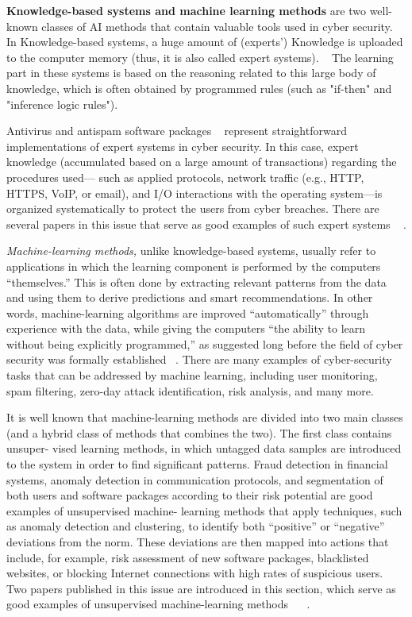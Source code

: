 \textbf{Knowledge-based systems and machine learning methods} are two well-known classes of AI methods that contain valuable tools
used in cyber security. In Knowledge-based systems, a huge amount of (experts') Knowledge is uploaded to the computer memory (thus, it is also called expert systems). ~\cite{Felgenbaum:1977:AAI:1622943.1623042}
The learning part in these systems is based on the reasoning related to this large body of knowledge, which is often obtained  by programmed rules (such as "if-then" and "inference logic rules").

Antivirus and antispam software packages ~\cite{Blanzieri:2008:SLT:1612711.1612715} represent straightforward
implementations of expert systems in cyber security. In this case, expert knowledge
(accumulated based on a large amount of transactions) regarding the procedures used—
such as applied protocols, network traffic (e.g., HTTP, HTTPS, VoIP, or email), and I/O
interactions with the operating system—is organized systematically to protect the
users from cyber breaches. There are several papers in this issue that serve as good
examples of such expert systems ~\cite{Maltinsky:2017:NNM:3055535.3040966} .


\textit{Machine-learning methods,} unlike knowledge-based systems, usually refer to applications in which the learning component is performed by the computers “themselves.”
This is often done by extracting relevant patterns from the data and using them to
derive predictions and smart recommendations. In other words, machine-learning algorithms are improved “automatically” through experience with the data, while giving
the computers “the ability to learn without being explicitly programmed,” as suggested
long before the field of cyber security was formally established ~\cite{Samuel:1959:SML:1661923.1661924}. There
are many examples of cyber-security tasks that can be addressed by machine learning,
including user monitoring, spam filtering, zero-day attack identification, risk analysis,
and many more.

It is well known that machine-learning methods are divided into two main classes
(and a hybrid class of methods that combines the two). The first class contains unsuper-
vised learning methods, in which untagged data samples are introduced to the system
in order to find significant patterns. Fraud detection in financial systems, anomaly
detection in communication protocols, and segmentation of both users and software
packages according to their risk potential are good examples of unsupervised machine-
learning methods that apply techniques, such as anomaly detection and clustering, to
identify both “positive” or “negative” deviations from the norm. These deviations are
then mapped into actions that include, for example, risk assessment of new software
packages, blacklisted websites, or blocking Internet connections with high rates of suspicious users. Two papers published in this issue are introduced in this section, which
serve as good examples of unsupervised machine-learning methods ~\cite{Maltinsky:2017:NNM:3055535.3040966}
~\cite{Harel:2017:CSR:3055535.3057729}.

